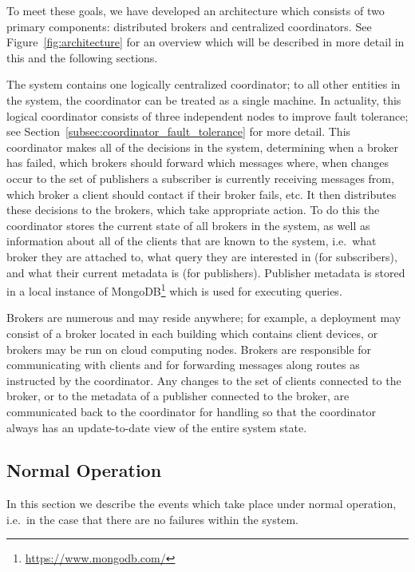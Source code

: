To meet these goals, we have developed an architecture which consists of two primary components: distributed brokers and centralized coordinators.
See Figure~\ref{fig:architecture} for an overview which will be described in more detail in this and the following sections.

The system contains one logically centralized coordinator; to all other entities in the system, the coordinator can be treated as a single machine.
In actuality, this logical coordinator consists of three independent nodes to improve fault tolerance; see Section~\ref{subsec:coordinator_fault_tolerance} for more detail.
This coordinator makes all of the decisions in the system, determining when a broker has failed, which brokers should forward which messages where, when changes occur to the set of publishers a subscriber is currently receiving messages from, which broker a client should contact if their broker fails, etc.
It then distributes these decisions to the brokers, which take appropriate action.
To do this the coordinator stores the current state of all brokers in the system, as well as information about all of the clients that are known to the system, i.e.\ what broker they are attached to, what query they are interested in (for subscribers), and what their current metadata is (for publishers).
Publisher metadata is stored in a local instance of MongoDB\footnote{\url{https://www.mongodb.com/}} which is used for executing queries.

Brokers are numerous and may reside anywhere; for example, a deployment may consist of a broker located in each building which contains client devices, or brokers may be run on cloud computing nodes.
Brokers are responsible for communicating with clients and for forwarding messages along routes as instructed by the coordinator.
Any changes to the set of clients connected to the broker, or to the metadata of a publisher connected to the broker, are communicated back to the coordinator for handling so that the coordinator always has an update-to-date view of the entire system state.

\subsection{Normal Operation}
\label{subsec:normal_operation}

In this section we describe the events which take place under normal operation, i.e.\ in the case that there are no failures within the system.

